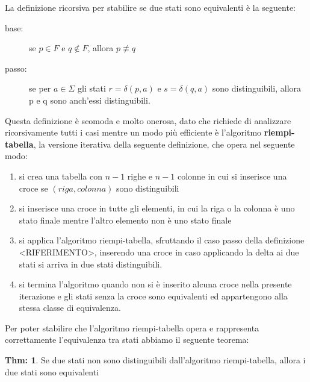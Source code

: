 \documentclass[a4paper]{book}
\theoremstyle{definition}%
\newtheorem{thm}{Thm:}[chapter]
\begin{document}
La definizione ricorsiva per stabilire se due stati sono equivalenti è la seguente:
\begin{description}
\item [base:] se $p \in F$ e $ q \not \in F$, allora $p \not \equiv q$
\item [passo:] se per $a \in \Sigma$ gli stati $r = \delta(p, a)$ e $s = \delta(q, a)$ sono distinguibili,
      allora p e q sono anch'essi distinguibili.
\end{description}
Questa definizione è scomoda e molto onerosa, dato che richiede di analizzare ricorsivamente tutti i casi mentre un modo più efficiente
è l'algoritmo \textbf{riempi-tabella}, la versione iterativa della seguente definizione, che opera nel seguente modo:
\begin{enumerate}
\item si crea una tabella con $n-1$ righe e $n-1$ colonne in cui si inserisce una croce se $(riga, colonna)$ sono distinguibili
\item si inserisce una croce in tutte gli elementi, in cui la riga o la colonna è uno stato finale mentre l'altro elemento non è uno stato finale
\item si applica l'algoritmo riempi-tabella, sfruttando il caso passo della definizione <RIFERIMENTO>, inserendo una croce in caso applicando la
  delta ai due stati si arriva in due stati distinguibili.
\item si termina l'algoritmo quando non si è inserito alcuna croce nella presente iterazione e gli stati senza la croce sono equivalenti ed
  appartengono alla stessa classe di equivalenza.
\end{enumerate}
Per poter stabilire che l'algoritmo riempi-tabella opera e rappresenta correttamente l'equivalenza tra stati abbiamo il seguente teorema:
\begin{thm}
  Se due stati non sono distinguibili dall'algoritmo riempi-tabella, allora i due stati sono equivalenti
\end{thm}
\end{document}
